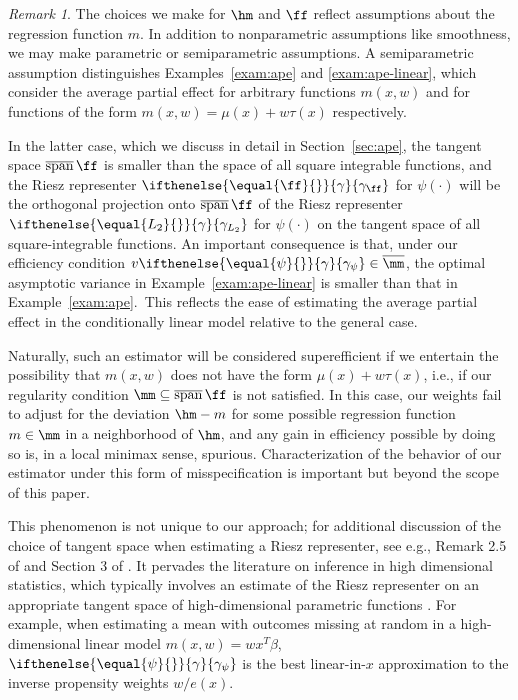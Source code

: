 \documentclass[aos,submission]{imsart}
\theoremstyle{plain}
\theoremstyle{remark}
\newtheorem{rema}{Remark}
\DeclareMathOperator*{\cspan}{\overline{span}}
\newcommand{\riesz}[1][]{\ifthenelse{\equal{#1}{}}{\gamma}{\gamma_{{#1}}}}
\begin{document}
\begin{rema}
\label{rema:semiparametric-models}
The choices we make for $\hm$ and $\ff$ reflect 
assumptions about the regression function $m$. In addition to nonparametric assumptions like smoothness, we may
make parametric or semiparametric assumptions. A semiparametric assumption 
distinguishes Examples~\ref{exam:ape} and \ref{exam:ape-linear}, which consider the average partial effect for arbitrary functions 
$m(x,w)$ and for functions of the form $m(x,w) = \mu(x) + w\tau(x)$ respectively. 

In the latter case, which we discuss in detail in
Section~\ref{sec:ape}, the tangent space $\cspan\ff$ is smaller than the space of all square integrable functions,
and the Riesz representer $\riesz[\ff]$ for $\psi(\cdot)$ will be the orthogonal projection onto $\cspan \ff$ of the Riesz representer $\riesz[L_2]$ for $\psi(\cdot)$ 
on the tangent space of all square-integrable functions. An important consequence is that,
under our efficiency condition $v\riesz[\psi]\in \overline\mm$,
the optimal asymptotic variance in Example~\ref{exam:ape-linear} is smaller than that in Example~\ref{exam:ape}.\footnotemark\
This reflects the ease of estimating the average partial effect in the conditionally linear model relative to the general case.

Naturally, such an estimator will be considered superefficient if we entertain the possibility that $m(x,w)$ does not have
the form $\mu(x) + w\tau(x)$, i.e., if our regularity condition $\mm \subseteq \cspan \ff$ is not satisfied. In this case,
our weights fail to adjust for the deviation $\hm - m$ for some possible regression function $m \in \mm$ in a neighborhood of $\hm$, 
and any gain in efficiency possible by doing so is, in a local minimax sense, spurious.
Characterization of the behavior of our estimator under this form of misspecification is important but beyond the scope of this paper.

This phenomenon is not unique to our approach; for additional discussion of the choice of tangent space when estimating a Riesz representer, see e.g., 
Remark 2.5 of \citet{chernozhukov2016double} and Section 3 of \citet{robins2007comment}. It pervades the literature on inference in high dimensional statistics,
which typically involves an estimate of the Riesz representer on an appropriate tangent space of high-dimensional parametric functions \citep[e.g.,][]{athey2016approximate, javanmard2014confidence, zhang2014confidence}. For example, when estimating a mean with outcomes missing at random in a high-dimensional linear model $m(x,w) = w x^T \beta$, 
$\riesz[\psi]$ is the best linear-in-$x$ approximation to the inverse propensity weights $w/e(x)$.


\end{rema}
\end{document}
